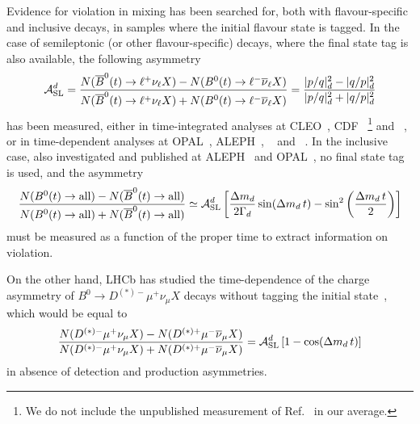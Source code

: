 Evidence for \CP violation in \Bd mixing
has been searched for,
both with flavour-specific and inclusive \Bd decays, 
in samples where the initial 
flavour state is tagged. In the case of semileptonic 
(or other flavour-specific) decays, 
where the final state tag is 
also available, the following asymmetry
\begin{equation} 
\ASLd = \frac{
N(\hbox{\Bdbar}(t) \to \ell^+      \nu_{\ell} X) -
N(\hbox{\Bd}(t)    \to \ell^- \bar{\nu}_{\ell} X) }{
N(\hbox{\Bdbar}(t) \to \ell^+      \nu_{\ell} X) +
N(\hbox{\Bd}(t)    \to \ell^- \bar{\nu}_{\ell} X) } 
= \frac{|p/q|_{\particle{d}}^2 - |q/p|_{\particle{d}}^2}%
{|p/q|_{\particle{d}}^2 + |q/p|_{\particle{d}}^2}
\labe{ASL}
\end{equation} 
has been measured, either in time-integrated analyses at 
CLEO~\cite{Behrens:2000qu,Jaffe:2001hz,*Jaffe:2001hz_cont},
CDF~\cite{Abe:1996zt}%
\footnote{
  \label{foot:life_mix:CDFnote9015:2007}
  We do not include the unpublished measurement of Ref.~\cite{CDFnote9015:2007} in our average.}
and \dzero~\cite{Abazov:2013uma,*Abazov:2011yk_mod,*Abazov:2010hv_mod_cont,*Abazov:2010hj_mod_cont,*Abazov:2011yk_cont,Abazov:2012uia},
or in time-dependent analyses at 
OPAL~\cite{Ackerstaff:1997vd}, ALEPH~\cite{Barate:2000uk}, 
\babar~\cite{Aubert:2003hd,*Aubert:2004xga_mod_cont,Aubert:2006nf,*Aubert:2002mn_mod_cont,Lees:2013sua,*Margoni:2013qx,*Aubert:2006sa_mod}
and \belle~\cite{Nakano:2005jb}.
In the inclusive case, also investigated and published
at ALEPH~\cite{Barate:2000uk} and OPAL~\cite{Abbiendi:1998av},
no final state tag is used, and the asymmetry~\cite{Beneke:1996hv,*Dunietz:1998av}
\begin{equation} 
\frac{
N(\hbox{\Bd}(t) \to {\rm all}) -
N(\hbox{\Bdbar}(t) \to {\rm all}) }{
N(\hbox{\Bd}(t) \to {\rm all}) +
N(\hbox{\Bdbar}(t) \to {\rm all}) } 
\simeq
\ASLd \left[ \frac{\dmd}{2\Gd} \sin(\dmd \,t) - 
\sin^2\left(\frac{\dmd \,t}{2}\right)\right] 
\labe{ASLincl}
\end{equation} 
must be measured as a function of the proper time to extract information 
on \CP violation.

On the other hand, LHCb has studied the time-dependence of the 
charge asymmetry of $B^0 \to D^{(*)-}\mu^+\nu_{\mu}X$ decays
without tagging the initial state~\cite{Aaij:2014nxa}, 
which would be equal to 
\begin{equation} 
\frac{N(D^{(*)-}\mu^+\nu_{\mu}X)-N(D^{(*)+}\mu^-\bar{\nu}_{\mu}X)}%
{N(D^{(*)-}\mu^+\nu_{\mu}X)+N(D^{(*)+}\mu^-\bar{\nu}_{\mu}X)} =
\ASLd \left[ 1- \cos(\dmd \,t)\right]
\label{eq:untagged_ASL}
\end{equation}
in absence of detection and production asymmetries.

